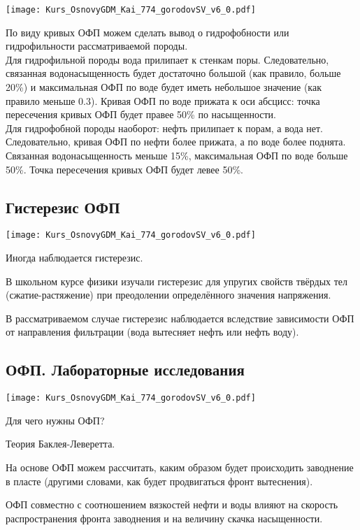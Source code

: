 \documentclass[main.tex]{subfiles}
\begin{document}
\texttt{[image: Kurs\_OsnovyGDM\_Kai\_774\_gorodovSV\_v6\_0.pdf]}

По виду кривых ОФП можем сделать вывод о гидрофобности или гидрофильности рассматриваемой породы.
\\

Для гидрофильной породы вода прилипает к стенкам поры. Следовательно, связанная водонасыщенность будет достаточно большой (как правило, больше 20\%) и максимальная ОФП по воде будет иметь небольшое значение (как правило меньше 0.3).
Кривая ОФП по воде прижата к оси абсцисс: точка пересечения кривых ОФП будет правее 50\% по насыщенности.
\\

Для гидрофобной породы наоборот: нефть прилипает к порам, а вода нет. Следовательно, кривая ОФП по нефти более прижата, а по воде более поднята.
Связанная водонасыщенность меньше 15\%, максимальная ОФП по воде больше 50\%. Точка пересечения кривых ОФП будет левее 50\%.

\subsection{Гистерезис ОФП}

\texttt{[image: Kurs\_OsnovyGDM\_Kai\_774\_gorodovSV\_v6\_0.pdf]}

Иногда наблюдается гистерезис.

В школьном курсе физики изучали гистерезис для упругих свойств твёрдых тел (сжатие-растяжение) при преодолении определённого значения напряжения.

В рассматриваемом случае гистерезис наблюдается вследствие зависимости ОФП от направления фильтрации (вода вытесняет нефть или нефть воду).

\subsection{ОФП. Лабораторные исследования}

\texttt{[image: Kurs\_OsnovyGDM\_Kai\_774\_gorodovSV\_v6\_0.pdf]}

Для чего нужны ОФП?

Теория Баклея-Леверетта.

На основе ОФП можем рассчитать, каким образом будет происходить заводнение в пласте  (другими словами, как будет продвигаться фронт вытеснения).

ОФП совместно с соотношением вязкостей нефти и воды влияют на скорость распространения фронта заводнения и на величину скачка насыщенности.
\end{document}

